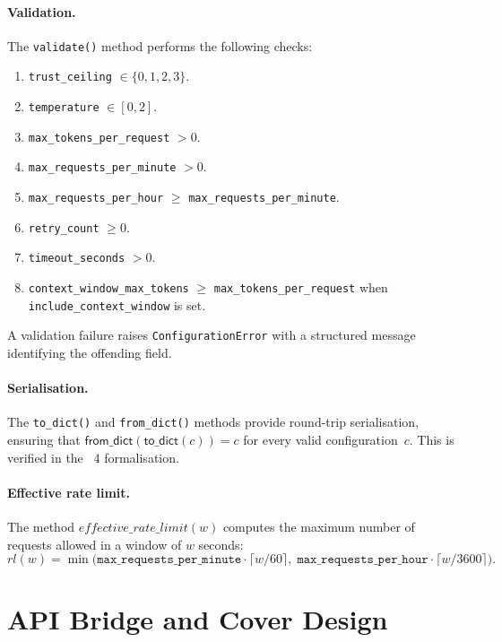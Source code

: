 \documentclass[11pt]{article}
\begin{document}
\paragraph{Validation.}
The \texttt{validate()} method performs the following checks:
\begin{enumerate}
  \item \texttt{trust\_ceiling} $\in \{0, 1, 2, 3\}$.
  \item \texttt{temperature} $\in [0, 2]$.
  \item \texttt{max\_tokens\_per\_request} $> 0$.
  \item \texttt{max\_requests\_per\_minute} $> 0$.
  \item \texttt{max\_requests\_per\_hour} $\ge$
        \texttt{max\_requests\_per\_minute}.
  \item \texttt{retry\_count} $\ge 0$.
  \item \texttt{timeout\_seconds} $> 0$.
  \item \texttt{context\_window\_max\_tokens} $\ge$
        \texttt{max\_tokens\_per\_request} when
        \texttt{include\_context\_window} is set.
\end{enumerate}
A validation failure raises \texttt{ConfigurationError} with a
structured message identifying the offending field.

\paragraph{Serialisation.}
The \texttt{to\_dict()} and \texttt{from\_dict()} methods
provide round-trip serialisation, ensuring that
$\mathsf{from\_dict}(\mathsf{to\_dict}(c)) = c$ for every valid
configuration~$c$.  This is verified in the \LEAN~4
formalisation.

\paragraph{Effective rate limit.}
The method $\mathit{effective\_rate\_limit}(w)$ computes the
maximum number of requests allowed in a window of $w$ seconds:
\[
  \mathit{rl}(w) = \min\!\bigl(
    \texttt{max\_requests\_per\_minute} \cdot \lceil w / 60 \rceil,\;
    \texttt{max\_requests\_per\_hour} \cdot \lceil w / 3600 \rceil
  \bigr).
\]

\section{API Bridge and Cover Design}\label{sec:api}
\end{document}
